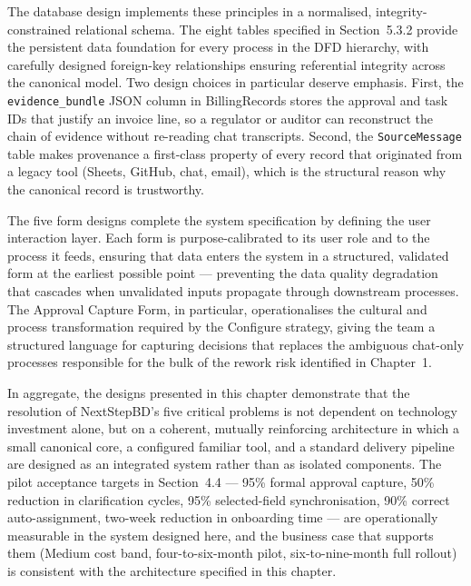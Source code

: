 \documentclass[12pt,a4paper]{report}
\begin{document}
The database design implements these principles in a normalised,
integrity-constrained relational schema. The eight tables specified in
Section~5.3.2 provide the persistent data foundation for every process in
the DFD hierarchy, with carefully designed foreign-key relationships
ensuring referential integrity across the canonical model. Two design
choices in particular deserve emphasis. First, the
\texttt{evidence\_bundle} JSON column in BillingRecords stores the
approval and task IDs that justify an invoice line, so a regulator or
auditor can reconstruct the chain of evidence without re-reading chat
transcripts. Second, the \texttt{SourceMessage} table makes provenance a
first-class property of every record that originated from a legacy tool
(Sheets, GitHub, chat, email), which is the structural reason why the
canonical record is trustworthy.

The five form designs complete the system specification by defining the
user interaction layer. Each form is purpose-calibrated to its user role
and to the process it feeds, ensuring that data enters the system in a
structured, validated form at the earliest possible point --- preventing
the data quality degradation that cascades when unvalidated inputs
propagate through downstream processes. The Approval Capture Form, in
particular, operationalises the cultural and process transformation
required by the Configure strategy, giving the team a structured language
for capturing decisions that replaces the ambiguous chat-only
processes responsible for the bulk of the rework risk identified in
Chapter~1.

In aggregate, the designs presented in this chapter demonstrate that the
resolution of NextStepBD's five critical problems is not dependent on
technology investment alone, but on a coherent, mutually reinforcing
architecture in which a small canonical core, a configured familiar
tool, and a standard delivery pipeline are designed as an integrated
system rather than as isolated components. The pilot acceptance targets
in Section~4.4 --- 95\% formal approval capture, 50\% reduction in
clarification cycles, 95\% selected-field synchronisation, 90\% correct
auto-assignment, two-week reduction in onboarding time --- are
operationally measurable in the system designed here, and the
business case that supports them (Medium cost band, four-to-six-month
pilot, six-to-nine-month full rollout) is consistent with the architecture
specified in this chapter.

\end{document}

